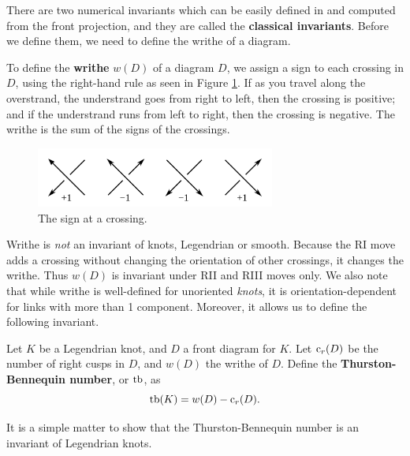 There are two numerical invariants which can be easily defined in and computed from the front projection, and they are called the \textbf{classical invariants}. Before we define them, we need to define the writhe of a diagram.

To define the \textbf{writhe} $w(D)$ of a diagram $D$, we assign a sign to each crossing in $D$, using the right-hand rule as seen in Figure \ref{fig:writhe}.
If as you travel along the overstrand, the understrand goes from right to left, then the crossing is positive; and if the understrand runs from left to right, then the crossing is negative. 
The writhe is the sum of the signs of the crossings.

\begin{figure}[ht]
    \centering
    \includegraphics[width=0.7\textwidth]{images/writhe.pdf}
    \caption{The sign at a crossing.}
    \label{fig:writhe}
\end{figure}

Writhe is \emph{not} an invariant of knots, Legendrian or smooth. Because the RI move adds a crossing without changing the orientation of other crossings, it changes the writhe. Thus $w(D)$ is invariant under RII and RIII moves only. We also note that while writhe is well-defined for unoriented \emph{knots}, it is orientation-dependent for links with more than 1 component. Moreover, it allows us to define the following invariant.

\begin{definition}
    Let $K$ be a Legendrian knot, and $D$ a front diagram for $K$. Let $\operatorname{c}_r(D)$ be the number of right cusps in $D$, and $w(D)$ the writhe of $D$.
    Define the \textbf{Thurston-Bennequin number}, or $\operatorname{tb}$, as
    \[
        \operatorname{tb}(K) = w(D) - \operatorname{c}_r(D).
    \]
\end{definition}

It is a simple matter to show that the Thurston-Bennequin number is an invariant of Legendrian knots.

